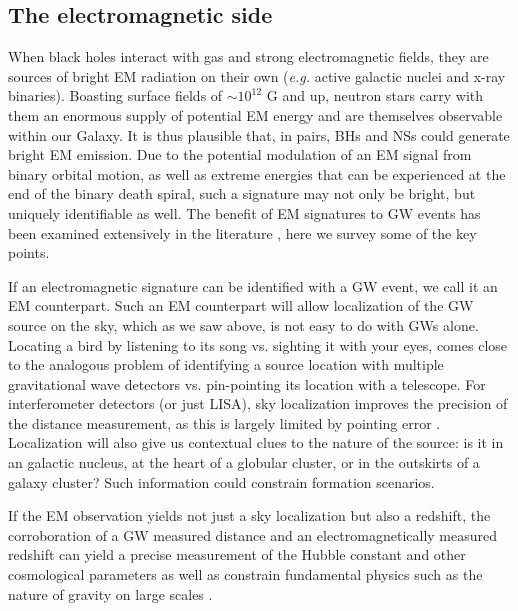 \subsection{The electromagnetic side}  When black holes interact with gas and
strong electromagnetic fields, they are sources of bright EM radiation on
their own (\emph{e.g.} active galactic nuclei and x-ray binaries). Boasting
surface fields of $\sim 10^{12}$ G and up, neutron stars carry with them an
enormous supply of potential EM energy and are themselves observable within
our Galaxy. It is thus plausible that, in pairs, BHs and NSs could generate
bright EM emission. Due to the potential modulation of an EM signal from
binary orbital motion, as well as extreme energies that can be experienced at
the end of the binary death spiral, such a signature may not only be bright,
but uniquely identifiable as well. The benefit of EM signatures to GW events
has been examined extensively in the literature
\citep[\emph{e.g.}]{Bloom:2009}, here we survey some of the key points.

If an electromagnetic signature can be identified with a GW event, we call it
an EM counterpart. Such an EM counterpart will allow localization of the GW
source on the sky, which as we saw above, is not easy to do with GWs alone.
Locating a bird by listening to its song vs. sighting it with your eyes, comes
close to the analogous problem of identifying a source location with multiple
gravitational wave detectors vs. pin-pointing its location with a telescope.
For interferometer detectors (or just LISA), sky localization improves the
precision of the distance measurement, as this is largely limited by pointing
error \citep{Cutler:1998, HughesLDist:2002}. Localization will also give us contextual
clues to the nature of the source: is it in an galactic nucleus, at the heart
of a globular cluster, or in the outskirts of a galaxy cluster? Such
information could constrain formation scenarios.

If the EM observation yields not just a sky localization but also a redshift,
the corroboration of a GW measured distance and an electromagnetically
measured redshift can yield a precise measurement of the Hubble constant and
other cosmological parameters \citep{Schutz:1986, KrolakSchutz:1987,
ChernoffFinn:1993, Schutz:2002, HolzHughes:2005, Dalal:2006, KocsisFrei+2006,
CutlerHolz:2009,  Nissanke:2010, Nishizawa+2011, TaylorGair:2012,
Tamanini:2016} as well as constrain fundamental physics such as the nature of
gravity on large scales \citep{DeffayetMenou:2007, CameraNishizawa:2013}.

